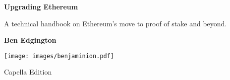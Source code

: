 \begin{titlepage}

   \begin{center}
       \vspace*{1cm}

       \Huge

       \textbf{Upgrading Ethereum}

       \Large

       \vspace{1.0cm}

       A technical handbook on Ethereum's move to proof of stake and beyond.
            
       \vspace{1.0cm}

       \textbf{Ben Edgington}

       \vfill
            
       \texttt{[image: images/benjaminion.pdf]}

       \vfill

       Capella Edition
            
   \end{center}
   \restoregeometry
\end{titlepage}
